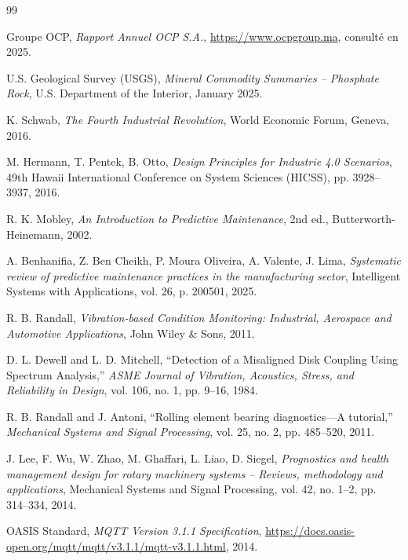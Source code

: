 \documentclass[12pt, a4paper, oneside]{report}
\begin{document}
\begin{thebibliography}{99}

  Groupe OCP,
  \textit{Rapport Annuel OCP S.A.},
  \url{https://www.ocpgroup.ma}, consulté en 2025.

  U.S. Geological Survey (USGS),
  \textit{Mineral Commodity Summaries -- Phosphate Rock},
  U.S. Department of the Interior, January 2025.

  K. Schwab,
  \textit{The Fourth Industrial Revolution},
  World Economic Forum, Geneva, 2016.

  M. Hermann, T. Pentek, B. Otto,
  \textit{Design Principles for Industrie 4.0 Scenarios},
  49th Hawaii International Conference on System Sciences (HICSS), pp. 3928--3937, 2016.

  R. K. Mobley,
  \textit{An Introduction to Predictive Maintenance},
  2nd ed., Butterworth-Heinemann, 2002.

  A. Benhanifia, Z. Ben Cheikh, P. Moura Oliveira, A. Valente, J. Lima,
  \textit{Systematic review of predictive maintenance practices in the manufacturing sector},
  Intelligent Systems with Applications, vol. 26, p. 200501, 2025.

  R. B. Randall,
  \textit{Vibration-based Condition Monitoring: Industrial, Aerospace and Automotive Applications},
  John Wiley \& Sons, 2011.

  D. L. Dewell and L. D. Mitchell,
  ``Detection of a Misaligned Disk Coupling Using Spectrum Analysis,''
  \textit{ASME Journal of Vibration, Acoustics, Stress, and Reliability in Design},
  vol. 106, no. 1, pp. 9--16, 1984.

  R. B. Randall and J. Antoni,
  ``Rolling element bearing diagnostics---A tutorial,''
  \textit{Mechanical Systems and Signal Processing},
  vol. 25, no. 2, pp. 485--520, 2011.

  J. Lee, F. Wu, W. Zhao, M. Ghaffari, L. Liao, D. Siegel,
  \textit{Prognostics and health management design for rotary machinery systems -- Reviews, methodology and applications},
  Mechanical Systems and Signal Processing, vol. 42, no. 1--2, pp. 314--334, 2014.

  OASIS Standard,
  \textit{MQTT Version 3.1.1 Specification},
  \url{https://docs.oasis-open.org/mqtt/mqtt/v3.1.1/mqtt-v3.1.1.html}, 2014.


\end{thebibliography}
\end{document}
